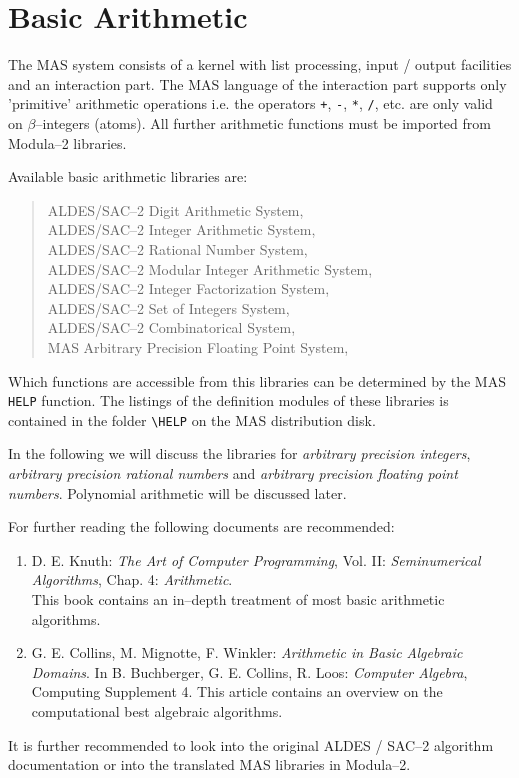 

\chapter{Basic Arithmetic}

The MAS system consists of a kernel with
list processing, input / output facilities and
an interaction part. The MAS language of
the interaction part supports only 'primitive' 
arithmetic operations i.e. the
operators \verb/+/, \verb/-/, \verb/*/, \verb./., etc.
are only valid on $\beta$--integers (atoms).
All further arithmetic functions must be imported 
from Modula--2 libraries. 

Available basic arithmetic libraries are:
\begin{quote}
\begin{obeylines} 
  ALDES/SAC--2 Digit Arithmetic System,
  ALDES/SAC--2 Integer Arithmetic System,
  ALDES/SAC--2 Rational Number System,
  ALDES/SAC--2 Modular Integer Arithmetic System, 
  ALDES/SAC--2 Integer Factorization System, 
  ALDES/SAC--2 Set of Integers System, 
  ALDES/SAC--2 Combinatorical System, 
  MAS          Arbitrary Precision Floating Point System, 
\end{obeylines}
\end{quote}

Which functions are accessible from this libraries
can be determined by the MAS \verb/HELP/ function. 
The listings of the definition modules of these libraries
is contained in the folder \verb/\HELP/ on the MAS
distribution disk. 

In the following we will discuss the 
libraries for {\em arbitrary precision integers}, 
{\em arbitrary precision rational numbers} and 
{\em arbitrary precision floating point numbers}.
Polynomial arithmetic will be discussed later. 

For further reading the following documents are recommended:
\begin{enumerate}
\item D. E. Knuth: {\em The Art of Computer Programming},
      Vol. II: {\em Seminumerical Algorithms},
      Chap. 4: {\em Arithmetic}. \\
      This book contains an in--depth treatment of most
      basic arithmetic algorithms.
\item G. E. Collins, M. Mignotte, F. Winkler: 
      {\em Arithmetic in Basic Algebraic Domains}.
      In B. Buchberger, G. E. Collins, R. Loos:
      {\em Computer Algebra}, Computing Supplement 4.
      This article contains an overview on 
      the computational best algebraic algorithms.  
\end{enumerate}
It is further recommended to look into the
original ALDES / SAC--2 algorithm documentation  
or into the translated MAS libraries in Modula--2.



